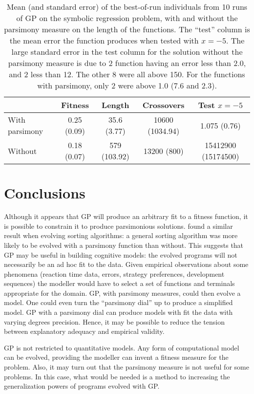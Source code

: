 \begin{table}
\begin{tabular}{l|cccc}
                &Fitness&Length&Crossovers&Test $x=-5$\\
\hline
With parsimony& 0.25 (0.09)& 35.6 (3.77)& 10600 (1034.94)& 1.075 (0.76)\\
Without&        0.18 (0.07)& 579 (103.92)& 13200 (800)& 15412900 (15174500)
\end{tabular}
\caption{Mean (and standard error) of the best-of-run individuals
from 10 runs of GP on the symbolic
regression problem, with and without the parsimony measure on the length
of the functions.
The ``test'' column is the mean error the function produces when tested
with $x=-5$.  The large standard error in the test column for the
solution without the parsimony measure is due to 2 function having an error
less than 2.0, and 2 less than 12.  The other 8 were all above 150. For
the functions with parsimony, only 2 were above 1.0 (7.6 and 2.3).
}\label{results}
\end{table}


\section*{Conclusions}

Although it appears that GP will produce an arbitrary fit to a fitness
function, it is possible to constrain it to produce parsimonious solutions.
 found a similar result when evolving sorting algorithms: a
general sorting algorithm was more likely to be evolved with a parsimony
function than without. This suggests that GP may be useful in building
cognitive models: the evolved programs will not necessarily be an ad hoc
fit to the data. Given empirical observations about some phenomena
(reaction time data, errors, strategy preferences, development sequences)
the modeller would have to select a set of functions and terminals
appropriate for the domain. GP, with parsimony measures, could then evolve
a model.  One could even turn the ``parsimony dial'' up to produce a
simplified model. GP with a parsimony dial can produce models with fit the
data with varying degrees precision. Hence, it may be possible to reduce
the tension between explanatory adequacy and empirical validity.

GP is not restricted to quantitative models.  Any form of computational
model can be evolved, providing the modeller can invent a fitness measure
for the problem.  Also, it may turn out that the parsimony measure is not
useful for some problems. In this case, what would be needed is a method
to increasing the generalization powers of programs evolved with GP.

